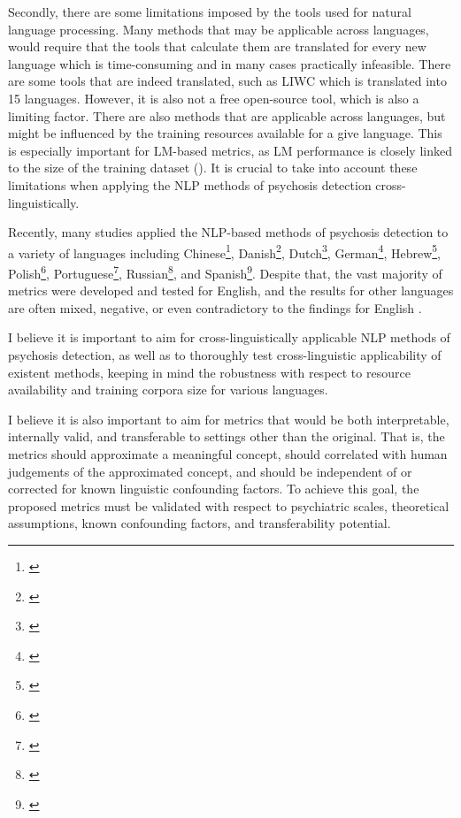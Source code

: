 Secondly, there are some limitations imposed by the tools used for natural language processing. Many methods that may be applicable across languages, would require that the tools that calculate them are translated for every new language which is time-consuming and in many cases practically infeasible. There are some tools that are indeed translated, such as LIWC which is translated into 15 languages. However, it is also not a free open-source tool, which is also a limiting factor. There are also methods that are applicable across languages, but might be influenced by the training resources available for a give language. This is especially important for LM-based metrics, as LM performance is closely linked to the size of the training dataset (\cite{kaplan2020scaling}). It is crucial to take into account these limitations when applying the NLP methods of psychosis detection cross-linguistically.

Recently, many studies applied the NLP-based methods of psychosis detection to a variety of languages including Chinese\footnote{\cite{parola2022speech}}, Danish\footnote{\cite{parola2022speech}}, Dutch\footnote{\cite{dore2019quantification, voppel2021quantified, wouts2021belabbert, corona2022assessing, voppel2023semantic, de2023acoustic}}, German\footnote{\cite{koranova2017analyzing, just2019coherence, just2020modeling, parola2022speech, schneider2023syntactic}}, Hebrew\footnote{\cite{bar2019semantic, ziv2022morphological, shriki2022masking}}, Polish\footnote{\cite{sarzynska2021detecting}}, Portuguese\footnote{\cite{mota2014graph, mota2017thought, mota2022happy, argolo2023burnishing}}, Russian\footnote{\cite{panicheva2019semantic, panicheva2020corpus, ryazanskaya2020automated}}, and Spanish\footnote{\cite{palominos2023coreference}}. Despite that, the vast majority of metrics were developed and tested for English, and the results for other languages are often mixed, negative, or even contradictory to the findings for English \citep{koranova2017analyzing, bar2019semantic, panicheva2019semantic, dore2019quantification, parola2022speech}. 

I believe it is important to aim for cross-linguistically applicable NLP methods of psychosis detection, as well as to thoroughly test cross-linguistic applicability of existent methods, keeping in mind the robustness with respect to resource availability and training corpora size for various languages.

I believe it is also important to aim for metrics that would be both interpretable, internally valid, and transferable to settings other than the original. That is, the metrics should approximate a meaningful concept, should correlated with human judgements of the approximated concept, and should be independent of or corrected for known linguistic confounding factors. To achieve this goal, the proposed metrics must be validated with respect to psychiatric scales, theoretical assumptions, known confounding factors, and  transferability potential.


